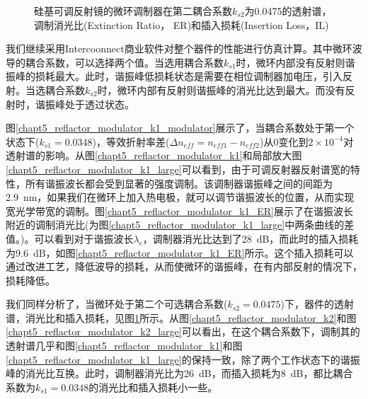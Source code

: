 \begin{figure}[htb]
{\begin{minipage}[]{0.5\textwidth}
		\end{minipage}}		
	\caption{硅基可调反射镜的微环调制器在第二耦合系数$k_{s2}$为0.0475的透射谱，调制消光比(Extinction Ratio， ER)和插入损耗(Insertion Loss，IL)}
	\label{chapt5_reflactor_modulator_k2_modulator}	
\end{figure}	
我们继续采用Intercoonnect商业软件对整个器件的性能进行仿真计算。其中微环波导的耦合系数，可以选择两个值。当选用耦合系数$k_{s1}$时，微环内部没有反射则谐振峰的损耗最大。此时，谐振峰低损耗状态是需要在相位调制器加电压，引入反射。当选耦合系数$k_{s2}$时，微环内部有反射则谐振峰的消光比达到最大。而没有反射时，谐振峰处于透过状态。

图\ref{chapt5_reflactor_modulator_k1_modulator}展示了，当耦合系数处于第一个状态下($k_{s1} = 0.0348$)，等效折射率差($\Delta n_{eff} = n_{eff1}-n_{eff2}$)从0变化到$2 \times  10^{-4}$对透射谱的影响。从图\ref{chapt5_reflactor_modulator_k1}和局部放大图\ref{chapt5_reflactor_modulator_k1_large}可以看到，由于可调反射器反射谱宽的特性，所有谐振波长都会受到显著的强度调制。该调制器谐振峰之间的间距为2.9~nm，如果我们在微环上加入热电极，就可以调节谐振波长的位置，从而实现宽光学带宽的调制。图\ref{chapt5_reflactor_modulator_k1_ER}展示了在谐振波长附近的调制消光比(为图\ref{chapt5_reflactor_modulator_k1_large}中两条曲线的差值。)。可以看到对于谐振波长$\lambda_c$，调制器消光比达到了28~dB，而此时的插入损耗为9.6~dB，如图\ref{chapt5_reflactor_modulator_k1_ER}所示。这个插入损耗可以通过改进工艺，降低波导的损耗，从而使微环的谐振峰，在有内部反射的情况下，损耗降低。

我们同样分析了，当微环处于第二个可选耦合系数($k_{s2} = 0.0475$)下，器件的透射谱，消光比和插入损耗，见图\ref{chapt5_reflactor_modulator_k2_modulator}所示。从图\ref{chapt5_reflactor_modulator_k2}和图\ref{chapt5_reflactor_modulator_k2_large}可以看出，在这个耦合系数下，调制其的透射谱几乎和图\ref{chapt5_reflactor_modulator_k1}和图\ref{chapt5_reflactor_modulator_k1_large}的保持一致，除了两个工作状态下的谐振峰的消光比互换。此时，调制器消光比为26~dB，而插入损耗为8~dB，都比耦合系数为$k_{s1}=0.0348$的消光比和插入损耗小一些。

